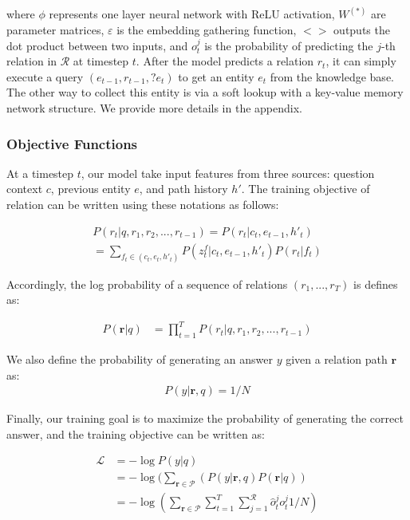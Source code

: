 where $\phi$ represents one layer neural network with ReLU activation, $W^{(*)}$ are parameter matrices, $\varepsilon$ is the embedding gathering function, $<>$ outputs the dot product between two inputs, and $o_t^j$ is the probability of predicting the $j$-th relation in $\mathcal{R}$ at timestep $t$. After the model predicts a relation $r_t$, it can simply execute a query $(e_{t-1}, r_{t-1}, ?e_t)$ to get an entity $e_t$ from the knowledge base. The other way to collect this entity is via a soft lookup with a key-value memory network structure. We provide more details in the appendix.


\subsubsection{Objective Functions}
At a timestep $t$, our model take input features from three sources: question context $c$, previous entity $e$, and path history $h'$. The training objective of relation can be written using these notations as follows:


\begin{equation}
\begin{aligned}
P(r_t|q,r_1,r_2,...,r_{t-1}) = P(r_t|c_t, e_{t-1}, h'_t) \\
       = \sum_{f_t \in (c_t,e_t,h'_t)}P(z_t^f|c_t,e_{t-1},h'_t)P(r_t|f_t)
\end{aligned}
\end{equation}

Accordingly, the log probability of a sequence of relations $(r_1,...,r_{T})$ is defines as:

\begin{equation}
\begin{aligned}
P(\mathbf{r}|q) &= \prod_{t=1}^{T} P(r_t|q,r_1,r_2,...,r_{t-1}) 
\end{aligned}
\end{equation}

We also define the probability of generating an answer $y$ given a relation path $\mathbf{r}$ as:
\begin{align}
P(y|\mathbf{r},q) = 1/N
\end{align}

Finally, our training goal is to maximize the probability of generating the correct answer, and the training objective can be written as:

\begin{equation}
\begin{aligned}
\mathcal{L} &= -\log P(y|q) \\
            &= -\log(\sum_{\mathbf{r}\in \mathcal{P}}( P(y|\mathbf{r},q)P(\mathbf{r}|q))\\
            &= -\log(\sum_{\mathbf{r}\in \mathcal{P}} \sum_{t=1}^T\sum_{j=1}^{\mathcal{R}}\hat{o}^j_t{o^j_t} 1/N)
\end{aligned}
\label{obj:latent}
\end{equation}


